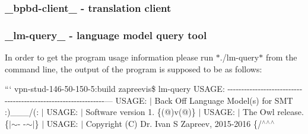 \subsubsection*{\+\_\+bpbd-\/client\+\_\+ -\/ translation client}

\subsubsection*{\+\_\+lm-\/query\+\_\+ -\/ language model query tool}

In order to get the program usage information please run $\ast$./lm-\/query$\ast$ from the command line, the output of the program is supposed to be as follows\+:

``` vpn-\/stud-\/146-\/50-\/150-\/5\+:build zapreevis\$ lm-\/query U\+S\+A\+G\+E\+: -\/-\/-\/-\/-\/-\/-\/-\/-\/-\/-\/-\/-\/-\/-\/-\/-\/-\/-\/-\/-\/-\/-\/-\/-\/-\/-\/-\/-\/-\/-\/-\/-\/-\/-\/-\/-\/-\/-\/-\/-\/-\/-\/-\/-\/-\/-\/-\/-\/-\/-\/-\/-\/-\/-\/-\/-\/-\/-\/-\/-\/-\/-\/--- U\+S\+A\+G\+E\+: $\vert$ Back Off Language Model(s) for S\+M\+T \+:)\+\_\+\+\_\+\+\_\+/(\+: $\vert$ U\+S\+A\+G\+E\+: $\vert$ Software version 1. \{(@)v(@)\} $\vert$ U\+S\+A\+G\+E\+: $\vert$ The Owl release. \{$\vert$$\sim$-\/ -\/$\sim$$\vert$\} $\vert$ U\+S\+A\+G\+E\+: $\vert$ Copyright (C) Dr. Ivan S Zapreev, 2015-\/2016 \{/$^\wedge$\textquotesingle{}$^\wedge$\textquotesingle{}$^\wedge$ 